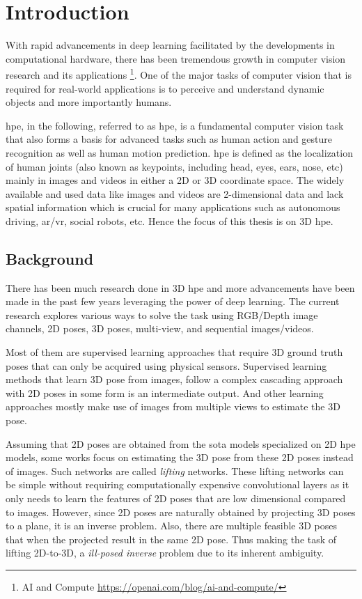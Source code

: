 \chapter{Introduction}
\label{chap:introduction}
With rapid advancements in deep learning facilitated by the developments in computational hardware, there has been tremendous growth in computer vision research and its applications \footnote{AI and Compute  \url{https://openai.com/blog/ai-and-compute/}}. One of the major tasks of computer vision that is required for real-world applications is to perceive and understand dynamic objects and more importantly humans.  %

\acl{hpe}, in the following, referred to as \acs{hpe}, is a fundamental computer vision task that also forms a basis for advanced tasks such as human action and gesture recognition as well as human motion prediction. \ac{hpe} is defined as the localization of human joints (also known as keypoints, including head, eyes, ears, nose, etc) mainly in images and videos in either a 2D or 3D coordinate space. The widely available and used data like images and videos are 2-dimensional data and lack spatial information which is crucial for many applications such as autonomous driving, \ac{ar/vr}, social robots, etc. Hence the focus of this thesis is on 3D \ac{hpe}.

\section{Background}
\label{sec:background}

There has been much research done in 3D \ac{hpe} and more advancements have been made in the past few years leveraging the power of deep learning. The current research explores various ways to solve the task using RGB/Depth image channels, 2D poses, 3D poses, multi-view, and sequential images/videos. 

Most of them are supervised learning approaches that require 3D ground truth poses that can only be acquired using physical sensors. Supervised learning methods that learn 3D pose from images, follow a complex cascading approach with 2D poses in some form is an intermediate output. And other learning approaches mostly make use of images from multiple views to estimate the 3D pose. 

Assuming that 2D poses are obtained from the \ac{sota} models specialized on 2D \ac{hpe} models, some works focus on estimating the 3D pose from these 2D poses instead of images. Such networks are called \textit{lifting} networks. These lifting networks can be simple without requiring computationally expensive convolutional layers as it only needs to learn the features of 2D poses that are low dimensional compared to images. However, since 2D poses are naturally obtained by projecting 3D poses to a plane, it is an inverse problem. Also, there are multiple feasible 3D poses that when the projected result in the same 2D pose. Thus making the task of lifting 2D-to-3D, a \textit{ill-posed inverse} problem due to its inherent ambiguity.

